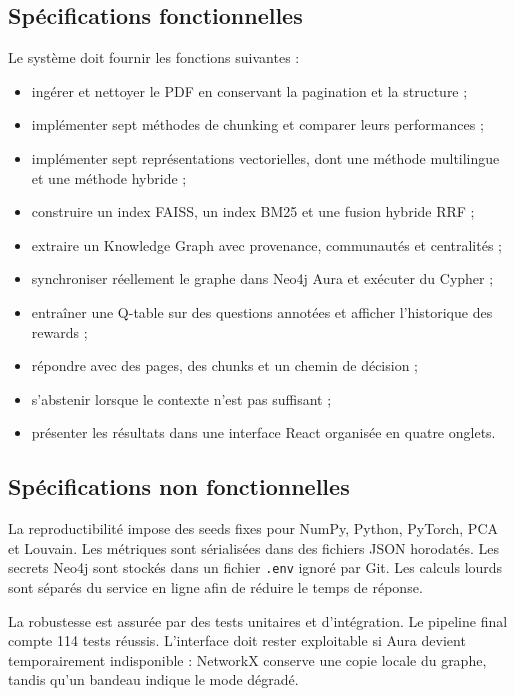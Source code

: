 \documentclass[12pt,a4paper,oneside]{report}
\newcommand{\tech}[1]{\texttt{#1}}
\begin{document}
\subsection{Spécifications fonctionnelles}
Le système doit fournir les fonctions suivantes :
\begin{itemize}
  \item ingérer et nettoyer le PDF en conservant la pagination et la structure ;
  \item implémenter sept méthodes de chunking et comparer leurs performances ;
  \item implémenter sept représentations vectorielles, dont une méthode multilingue et une méthode hybride ;
  \item construire un index FAISS, un index BM25 et une fusion hybride RRF ;
  \item extraire un Knowledge Graph avec provenance, communautés et centralités ;
  \item synchroniser réellement le graphe dans Neo4j Aura et exécuter du Cypher ;
  \item entraîner une Q-table sur des questions annotées et afficher l'historique des rewards ;
  \item répondre avec des pages, des chunks et un chemin de décision ;
  \item s'abstenir lorsque le contexte n'est pas suffisant ;
  \item présenter les résultats dans une interface React organisée en quatre onglets.
\end{itemize}

\subsection{Spécifications non fonctionnelles}
La reproductibilité impose des seeds fixes pour NumPy, Python, PyTorch, PCA et Louvain. Les métriques sont sérialisées dans des fichiers JSON horodatés. Les secrets Neo4j sont stockés dans un fichier \tech{.env} ignoré par Git. Les calculs lourds sont séparés du service en ligne afin de réduire le temps de réponse.

La robustesse est assurée par des tests unitaires et d'intégration. Le pipeline final compte 114 tests réussis. L'interface doit rester exploitable si Aura devient temporairement indisponible : NetworkX conserve une copie locale du graphe, tandis qu'un bandeau indique le mode dégradé.
\end{document}
